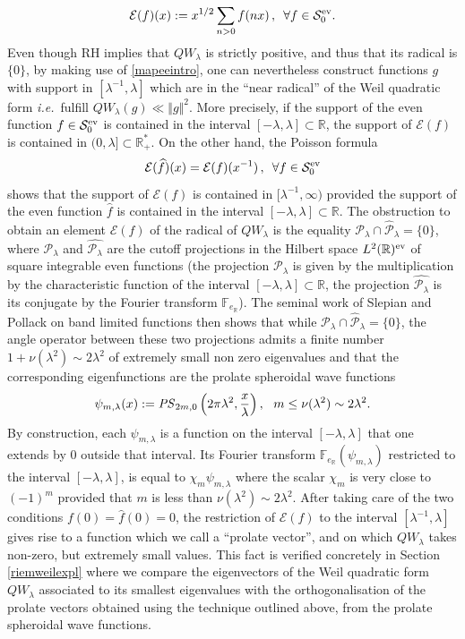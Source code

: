 \documentclass[cupthm]{CUP-JNL-JMJ}
\def\F{{\mathbb F}}
\def\R{{\mathbb R}}
\def\cE{{\mathcal E}}
\def\cP{{\mathcal P}}
\def\cS{{\mathcal S}}
\def\fourier{\F}
\def\qqq{\,,\,~\forall}
\def\sr0{{\cS^{\rm ev}_0}}
\def\fourierer{\fourier_{e_\R}}
\newcommand{\ie}{{\it i.e.\/}\ }
\numberwithin{equation}{section}
\theoremstyle{cupplain}
\theoremstyle{cupdefinition}
\theoremstyle{cupremark}
\theoremstyle{cupproof}
\begin{document}
\begin{equation}
\cE(f)(x):=x^{1/2}\sum_{n>0}f(nx) \qqq f\in \sr0.\label{mapeeintro}
\end{equation}
Even though  RH implies that $QW_\lambda$ is strictly positive, and thus that its radical is $\{0\}$, by making use of \eqref{mapeeintro}, one can nevertheless  construct   functions $g$ with  support in $[\lambda^{-1},\lambda]$ which are in the ``near radical'' of the Weil quadratic form \ie fulfill $QW_\lambda(g)\ll \Vert g\Vert^2$.  More precisely, if the support of the even function $f\in \sr0$ is contained in the interval $[-\lambda,\lambda]\subset \R$, the support of $\cE(f)$ is contained in $(0,\lambda]\subset \R_+^*$. On the other hand, the Poisson formula 
\begin{equation}
\cE(\widehat f)(x)=\cE(f)(x^{-1}) \qqq f\in \sr0\label{poissonintro}
\end{equation}
 shows that the support of $\cE(f)$ is contained in $[\lambda^{-1},\infty)$ provided the support of the even function $\widehat f$ is contained in the interval $[-\lambda,\lambda]\subset \R$. The obstruction to obtain an element $\cE(f)$ of the radical of $QW_\lambda$ is the equality $\cP_\lambda \cap \widehat\cP_\lambda=\{0\} $, where  $\cP_\lambda$ and $\widehat{\cP_\lambda}$ are the cutoff projections in the Hilbert space $L^2(\R)^{\rm ev}$ of square integrable even functions  (the projection $\cP_\lambda$ is given by the multiplication by the characteristic function of the interval  $[-\lambda,\lambda]\subset \R$, the projection $\widehat{\cP_\lambda}$ is its conjugate by the Fourier transform $\fourierer$). The seminal work of Slepian and Pollack \cite{Slepian, Sl, Slepian0} on band limited functions then shows that while $\cP_\lambda \cap \widehat\cP_\lambda=\{0\}$, the angle operator between these two projections admits a finite number $1+\nu(\lambda^2)\sim 2 \lambda^2$ of extremely small non zero eigenvalues and that  the corresponding eigenfunctions are the prolate spheroidal wave functions  
$$
\psi_{m,\lambda}(x):=\text{\textit{PS}}_{2m,0}\left(2 \pi  \lambda^2,\frac{x}{\lambda}\right), \  \ m\leq \nu(\lambda^2)\sim 2 \lambda^2.
$$
By construction, each $\psi_{m,\lambda}$ is a function on the interval $[-\lambda,\lambda]$ that one extends by $0$ outside that interval. Its Fourier transform $\fourier_{e_\R}(\psi_{m,\lambda})$ restricted to the interval $[-\lambda,\lambda]$, is equal to $\chi_m\psi_{m,\lambda}$  where the scalar $\chi_m$ is very close to $(-1)^m$ provided that $m$ is less than $\nu(\lambda^2)\sim 2 \lambda^2$. After taking care of the two conditions $f(0)=\widehat f(0)=0$,  the restriction of $\cE(f)$ to the interval $[\lambda^{-1},\lambda]$ gives rise to a function which we call a ``prolate vector'', and  on which $QW_\lambda$ takes non-zero, but extremely small values. This fact is verified concretely in Section \ref{riemweilexpl}  where we compare the eigenvectors of the Weil quadratic form $QW_\lambda$  associated to its smallest eigenvalues with the orthogonalisation of the prolate vectors  obtained using the technique outlined above, from the prolate spheroidal wave functions. 
\end{document}
